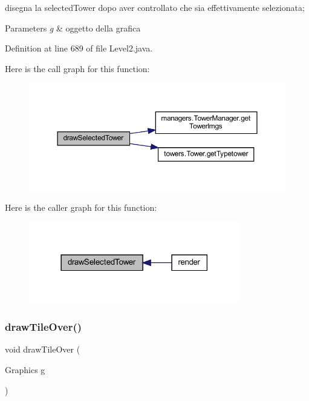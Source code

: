 disegna la selected\+Tower dopo aver controllato che sia effettivamente selezionata; 


\begin{DoxyParams}{Parameters}
{\em g} & oggetto della grafica \\
\hline
\end{DoxyParams}


Definition at line 689 of file Level2.\+java.

Here is the call graph for this function\+:\nopagebreak
\begin{figure}[H]
\begin{center}
\leavevmode
\includegraphics[width=350pt]{classscenes_1_1_level2_a0a97d0bb6d32640b2ae351707946abf7_cgraph}
\end{center}
\end{figure}
Here is the caller graph for this function\+:\nopagebreak
\begin{figure}[H]
\begin{center}
\leavevmode
\includegraphics[width=261pt]{classscenes_1_1_level2_a0a97d0bb6d32640b2ae351707946abf7_icgraph}
\end{center}
\end{figure}
\mbox{\label{classscenes_1_1_level2_ac299bbbbb70f97ae032c1345d5937378}} 
\subsubsection{\texorpdfstring{draw\+Tile\+Over()}{drawTileOver()}}
{\footnotesize\ttfamily void draw\+Tile\+Over (\begin{DoxyParamCaption}\item[{Graphics}]{g }\end{DoxyParamCaption})\hspace{0.3cm}{\ttfamily [private]}}



